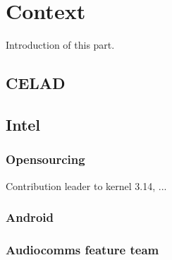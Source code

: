 \chapter{Context}

Introduction of this part.

\section{CELAD}

\section{Intel}
\subsection{Opensourcing}
Contribution leader to kernel 3.14, ...

\subsection{Android}

\subsection{Audiocomms feature team}

